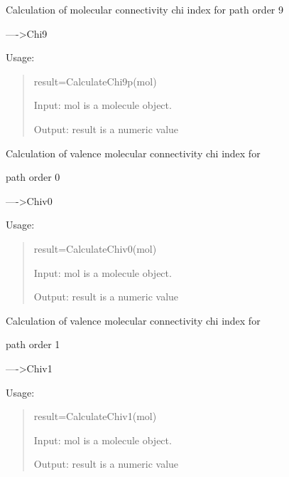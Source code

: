 \documentclass[letterpaper,10pt,english]{sphinxmanual}
\begin{document}

\begin{fulllineitems}
\label{reference/connectivity:connectivity.CalculateChi9p}
Calculation of molecular connectivity chi index for path order 9

----\textgreater{}Chi9

Usage:
\begin{quote}

result=CalculateChi9p(mol)

Input: mol is a molecule object.

Output: result is a numeric value
\end{quote}

\end{fulllineitems}


\begin{fulllineitems}
\label{reference/connectivity:connectivity.CalculateChiv0}
Calculation of valence molecular connectivity chi index for

path order 0

----\textgreater{}Chiv0

Usage:
\begin{quote}

result=CalculateChiv0(mol)

Input: mol is a molecule object.

Output: result is a numeric value
\end{quote}

\end{fulllineitems}


\begin{fulllineitems}
\label{reference/connectivity:connectivity.CalculateChiv1}
Calculation of valence molecular connectivity chi index for

path order 1

----\textgreater{}Chiv1

Usage:
\begin{quote}

result=CalculateChiv1(mol)

Input: mol is a molecule object.

Output: result is a numeric value
\end{quote}

\end{fulllineitems}
\end{document}
